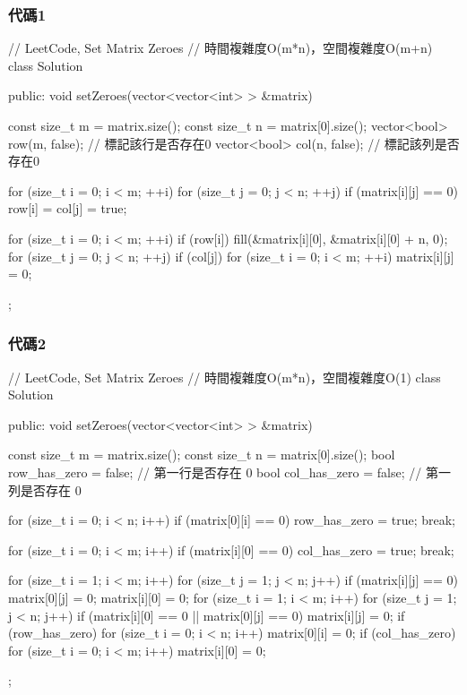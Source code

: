 \subsubsection{代碼1}
\begin{Code}
// LeetCode, Set Matrix Zeroes
// 時間複雜度O(m*n)，空間複雜度O(m+n)
class Solution {
public:
    void setZeroes(vector<vector<int> > &matrix) {
        const size_t m = matrix.size();
        const size_t n = matrix[0].size();
        vector<bool> row(m, false); // 標記該行是否存在0
        vector<bool> col(n, false); // 標記該列是否存在0

        for (size_t i = 0; i < m; ++i) {
            for (size_t j = 0; j < n; ++j) {
                if (matrix[i][j] == 0) {
                    row[i] = col[j] = true;
                }
            }
        }

        for (size_t i = 0; i < m; ++i) {
            if (row[i])
                fill(&matrix[i][0], &matrix[i][0] + n, 0);
        }
        for (size_t j = 0; j < n; ++j) {
            if (col[j]) {
                for (size_t i = 0; i < m; ++i) {
                    matrix[i][j] = 0;
                }
            }
        }
    }
};
\end{Code}


\subsubsection{代碼2}
\begin{Code}
// LeetCode, Set Matrix Zeroes
// 時間複雜度O(m*n)，空間複雜度O(1)
class Solution {
public:
    void setZeroes(vector<vector<int> > &matrix) {
        const size_t m = matrix.size();
        const size_t n = matrix[0].size();
        bool row_has_zero = false; // 第一行是否存在 0
        bool col_has_zero = false; // 第一列是否存在 0

        for (size_t i = 0; i < n; i++)
            if (matrix[0][i] == 0) {
                row_has_zero = true;
                break;
            }

        for (size_t i = 0; i < m; i++)
            if (matrix[i][0] == 0) {
                col_has_zero = true;
                break;
            }

        for (size_t i = 1; i < m; i++)
            for (size_t j = 1; j < n; j++)
                if (matrix[i][j] == 0) {
                    matrix[0][j] = 0;
                    matrix[i][0] = 0;
                }
        for (size_t i = 1; i < m; i++)
            for (size_t j = 1; j < n; j++)
                if (matrix[i][0] == 0 || matrix[0][j] == 0)
                    matrix[i][j] = 0;
        if (row_has_zero)
            for (size_t i = 0; i < n; i++)
                matrix[0][i] = 0;
        if (col_has_zero)
            for (size_t i = 0; i < m; i++)
                matrix[i][0] = 0;
    }
};
\end{Code}


